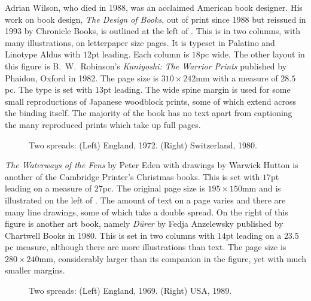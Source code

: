 \documentclass[10pt,letterpaper]{memoir}
\newlength{\pwlayi}\setlength{\pwlayi}{0.45\textwidth} %
\newlength{\pwlayii}\setlength{\pwlayii}{0.45\pwlayi}
\begin{document}
    Adrian Wilson, who died in 1988, was an acclaimed American book designer.
His work on book design, \textit{The Design of Books}, out of print since
1988 but reissued in 1993 by
Chronicle Books, is outlined
at the left of . This is in two columns, with many illustrations,
on letterpaper size pages. It is typeset in Palatino and Linotype Aldus
with $12$pt leading. Each column is $18$pc wide. The other layout in this
figure is B.~W.~Robinson's \textit{Kuniyoshi: The Warrior Prints} published
by Phaidon, Oxford in 1982. The page size is $310 \times 242$mm with a
measure of $28.5$pc. The type is set with $13$pt leading. The wide spine
margin is used for some small reproductions of Japanese woodblock prints, 
some of which extend across the binding itself. The majority of the book
has no text apart from captioning the many reproduced prints which take 
up full pages.

\begin{figure}
\centering
\begin{minipage}[b]{\pwlayi}
\end{minipage}
\hfill
\begin{minipage}[b]{\pwlayi}
\end{minipage}
\caption[Two spreads: England, 1972 and Switzerland, 1980]%
        {Two spreads: (Left) England, 1972.
         (Right) Switzerland, 1980.} \label{fb:15}
\end{figure}

    \textit{The Waterways of the Fens} by Peter Eden with drawings by
Warwick Hutton is another of the Cambridge Printer's Christmas books.
This is set with $17$pt leading on a measure of $27$pc. The original
page size is $195 \times 150$mm and is illustrated on the left 
of . 
The amount of text on a page varies
and there are many line drawings, some of which take a double spread.
On the right of this figure is another art book, namely \textit{D\"{u}rer}
by Fedja Anzelewsky published by Chartwell Books in 1980. This is set in
two columns with $14$pt leading on a $23.5$pc measure, 
although there are more illustrations than text. The page
size is $280 \times 240$mm, considerably larger than its companion in
the figure, yet with much smaller margins.

\begin{figure}
\centering
\begin{minipage}[b]{\pwlayi}
\end{minipage}
\hfill
\begin{minipage}[b]{\pwlayi}
\end{minipage}
\caption[Two spreads: England, 1969 and USA 1989]%
        {Two spreads: (Left) England, 1969.
         (Right) USA, 1989.} \label{fb:16}
\end{figure}
\end{document}
